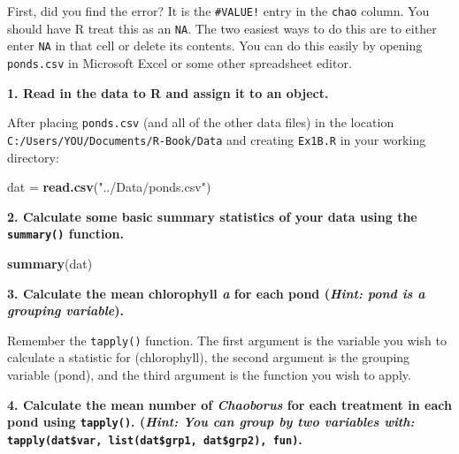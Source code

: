 \documentclass[]{book}
\newenvironment{Shaded}{\begin{snugshade}}{\end{snugshade}}
\newcommand{\KeywordTok}[1]{\textcolor[rgb]{0.13,0.29,0.53}{\textbf{#1}}}
\newcommand{\StringTok}[1]{\textcolor[rgb]{0.31,0.60,0.02}{#1}}
\newcommand{\OperatorTok}[1]{\textcolor[rgb]{0.81,0.36,0.00}{\textbf{#1}}}
\newcommand{\NormalTok}[1]{#1}
\theoremstyle{definition}
\theoremstyle{definition}
\theoremstyle{definition}
\theoremstyle{remark}
\begin{document}
First, did you find the error? It is the \texttt{\#VALUE!} entry in the
\texttt{chao} column. You should have R treat this as an \texttt{NA}.
The two easiest ways to do this are to either enter \texttt{NA} in that
cell or delete its contents. You can do this easily by opening
\texttt{ponds.csv} in Microsoft Excel or some other spreadsheet editor.

\textbf{1. Read in the data to R and assign it to an object.}

After placing \texttt{ponds.csv} (and all of the other data files) in
the location \texttt{C:/Users/YOU/Documents/R-Book/Data} and creating
\texttt{Ex1B.R} in your working directory:

\begin{Shaded}
\begin{Highlighting}[]
\NormalTok{dat =}\StringTok{ }\KeywordTok{read.csv}\NormalTok{(}\StringTok{"../Data/ponds.csv"}\NormalTok{)}
\end{Highlighting}
\end{Shaded}

\textbf{2. Calculate some basic summary statistics of your data using
the \texttt{summary()} function.}

\begin{Shaded}
\begin{Highlighting}[]
\KeywordTok{summary}\NormalTok{(dat)}
\end{Highlighting}
\end{Shaded}

\textbf{3. Calculate the mean chlorophyll \emph{a} for each pond
(\emph{Hint: pond is a grouping variable}).}

Remember the \texttt{tapply()} function. The first argument is the
variable you wish to calculate a statistic for (chlorophyll), the second
argument is the grouping variable (pond), and the third argument is the
function you wish to apply.

\begin{Shaded}
\end{Shaded}

\textbf{4. Calculate the mean number of \emph{Chaoborus} for each
treatment in each pond using \texttt{tapply()}. (\emph{Hint: You can
group by two variables with:}
\texttt{tapply(dat\$var,\ list(dat\$grp1,\ dat\$grp2),\ fun)}.}
\end{document}
